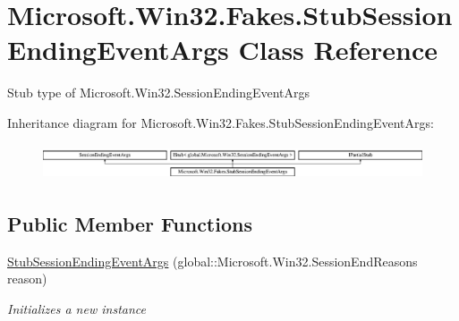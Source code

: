 \hypertarget{class_microsoft_1_1_win32_1_1_fakes_1_1_stub_session_ending_event_args}{\section{Microsoft.\-Win32.\-Fakes.\-Stub\-Session\-Ending\-Event\-Args Class Reference}
\label{class_microsoft_1_1_win32_1_1_fakes_1_1_stub_session_ending_event_args}
}


Stub type of Microsoft.\-Win32.\-Session\-Ending\-Event\-Args 


Inheritance diagram for Microsoft.\-Win32.\-Fakes.\-Stub\-Session\-Ending\-Event\-Args\-:\begin{figure}[H]
\begin{center}
\leavevmode
\includegraphics[height=1.072797cm]{class_microsoft_1_1_win32_1_1_fakes_1_1_stub_session_ending_event_args}
\end{center}
\end{figure}
\subsection*{Public Member Functions}
\begin{DoxyCompactItemize}
\item 
\hyperlink{class_microsoft_1_1_win32_1_1_fakes_1_1_stub_session_ending_event_args_a3b6b70fb5c80d14866269edd986a43d0}{Stub\-Session\-Ending\-Event\-Args} (global\-::\-Microsoft.\-Win32.\-Session\-End\-Reasons reason)
\begin{DoxyCompactList}\small\item\em Initializes a new instance\end{DoxyCompactList}\end{DoxyCompactItemize}

